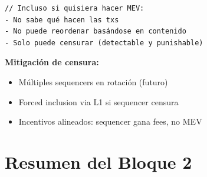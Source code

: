 \documentclass[11pt,a4paper,twoside,openright]{book}
\theoremstyle{definition}
\theoremstyle{plain}
\theoremstyle{remark}
\begin{document}
\begin{bancozk}
\begin{verbatim}
// Incluso si quisiera hacer MEV:
- No sabe qué hacen las txs
- No puede reordenar basándose en contenido
- Solo puede censurar (detectable y punishable)
\end{verbatim}

\textbf{Mitigación de censura:}
\begin{itemize}
    \item Múltiples sequencers en rotación (futuro)
    \item Forced inclusion via L1 si sequencer censura
    \item Incentivos alineados: sequencer gana fees, no MEV
\end{itemize}
\end{bancozk}

\section{Resumen del Bloque 2}
\end{document}
